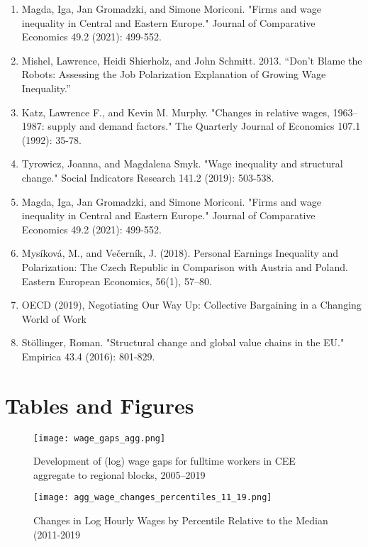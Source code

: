 \documentclass{article}
\begin{document}
\begin{enumerate}
\item Magda, Iga, Jan Gromadzki, and Simone Moriconi. "Firms and wage inequality in Central and Eastern Europe." Journal of Comparative Economics 49.2 (2021): 499-552.

\item Mishel, Lawrence, Heidi Shierholz, and John Schmitt. 2013. “Don’t Blame the Robots: Assessing the Job Polarization Explanation of Growing Wage Inequality.”

\item Katz, Lawrence F., and Kevin M. Murphy. "Changes in relative wages, 1963–1987: supply and demand factors." The Quarterly Journal of Economics 107.1 (1992): 35-78.

\item Tyrowicz, Joanna, and Magdalena Smyk. "Wage inequality and structural change." Social Indicators Research 141.2 (2019): 503-538.

\item Magda, Iga, Jan Gromadzki, and Simone Moriconi. "Firms and wage inequality in Central and Eastern Europe." Journal of Comparative Economics 49.2 (2021): 499-552.

\item Mysíková, M., and Večerník, J. (2018). Personal Earnings Inequality and Polarization: The Czech Republic in Comparison with Austria and Poland. Eastern European Economics, 56(1), 57–80.

\item OECD (2019), Negotiating Our Way Up: Collective Bargaining in a Changing World of Work

\item Stöllinger, Roman. "Structural change and global value chains in the EU." Empirica 43.4 (2016): 801-829.

\end{enumerate}
\section{Tables and Figures}


\begin{figure}[!htbp]%
    \centering
    {\texttt{[image: wage\_gaps\_agg.png]} }
    \caption{Development of (log) wage gaps for fulltime workers in CEE aggregate to regional blocks,  2005–2019}
    \label{agg_wage_gaps_CEE}
\end{figure}



\begin{figure}[!htbp]%
    \centering
    {\texttt{[image: agg\_wage\_changes\_percentiles\_11\_19.png]} }
    \caption{Changes in Log Hourly Wages by Percentile Relative to the Median (2011-2019}
    \label{agg_wage_changes_percentiles_11_19}
\end{figure}
\end{document}
